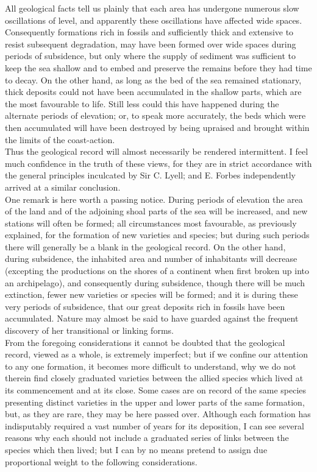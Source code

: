 \indent All geological facts tell us plainly that each area has undergone numerous slow oscillations of level, and apparently these oscillations have affected wide spaces.  Consequently formations rich in fossils and sufficiently thick and extensive to resist subsequent degradation, may have been formed over wide spaces during periods of subsidence, but only where the supply of sediment was sufficient to keep the sea shallow and to embed and preserve the remains before they had time to decay. On the other hand, as long as the bed of the sea remained stationary, thick deposits could not have been accumulated in the shallow parts, which are the most favourable to life. Still less could this have happened during the alternate periods of elevation; or, to speak more accurately, the beds which were then accumulated will have been destroyed by being upraised and brought within the limits of the coast-action.\\
\indent Thus the geological record will almost necessarily be rendered intermittent. I feel much confidence in the truth of these views, for they are in strict accordance with the general principles inculcated by Sir C. Lyell; and E. Forbes independently arrived at a similar conclusion.\\
\indent One remark is here worth a passing notice. During periods of elevation the area of the land and of the adjoining shoal parts of the sea will be increased, and new stations will often be formed; all circumstances most favourable, as previously explained, for the formation of new varieties and species; but during such periods there will generally be a blank in the geological record. On the other hand, during subsidence, the inhabited area and number of inhabitants will decrease (excepting the productions on the shores of a continent when first broken up into an archipelago), and consequently during subsidence, though there will be much extinction, fewer new varieties or species will be formed; and it is during these very periods of subsidence, that our great deposits rich in fossils have been accumulated. Nature may almost be said to have guarded against the frequent discovery of her transitional or linking forms.\\
\indent From the foregoing considerations it cannot be doubted that the geological record, viewed as a whole, is extremely imperfect; but if we confine our attention to any one formation, it becomes more difficult to understand, why we do not therein find closely graduated varieties between the allied species which lived at its commencement and at its close. Some cases are on record of the same species presenting distinct varieties in the upper and lower parts of the same formation, but, as they are rare, they may be here passed over. Although each formation has indisputably required a vast number of years for its deposition, I can see several reasons why each should not include a graduated series of links between the species which then lived; but I can by no means pretend to assign due proportional weight to the following considerations.\\
